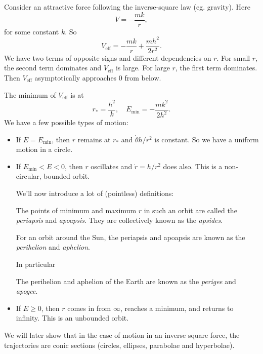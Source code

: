 \documentclass[a4paper]{article}
\begin{document}
\begin{eg}
  Consider an attractive force following the inverse-square law (eg. gravity). Here
  \[
    V = -\frac{mk}{r},
  \]
  for some constant $k$. So
  \[
    V_{\text{eff}} = -\frac{mk}{r} + \frac{mh^2}{2r^2}.
  \]
  We have two terms of opposite signs and different dependencies on $r$. For small $r$, the second term dominates and $V_{\text{eff}}$ is large. For large $r$, the first term dominates. Then $V_{\text{eff}}$ asymptotically approaches $0$ from below.
  \begin{center}
  \end{center}
  The minimum of $V_{\text{eff}}$ is at
  \[
    r_{*} = \frac{h^2}{k},\quad E_{\text{min}} = -\frac{mk^2}{2h^2}.
  \]
  We have a few possible types of motion:
  \begin{itemize}
    \item If $E = E_{\min}$, then $r$ remains at $r_*$ and $\dot{\theta} h/r^2$ is constant. So we have a uniform motion in a circle.
    \item If $E_{\min} < E < 0$, then $r$ oscillates and $\dot{r}=h/r^2$ does also. This is a non-circular, bounded orbit.

      We'll now introduce a lot of (pointless) definitions:

      \begin{defi}
        The points of minimum and maximum $r$ in such an orbit are called the \emph{periapsis} and \emph{apoapsis}. They are collectively known as the \emph{apsides}.
      \end{defi}

      \begin{defi}
        For an orbit around the Sun, the periapsis and apoapsis are known as the \emph{perihelion} and \emph{aphelion}.
      \end{defi}

      In particular
      \begin{defi}
        The perihelion and aphelion of the Earth are known as the \emph{perigee} and \emph{apogee}.
      \end{defi}

    \item If $E \geq 0$, then $r$ comes in from $\infty$, reaches a minimum, and returns to infinity. This is an unbounded orbit.
  \end{itemize}

  We will later show that in the case of motion in an inverse square force, the trajectories are conic sections (circles, ellipses, parabolae and hyperbolae).
\end{eg}
\end{document}
